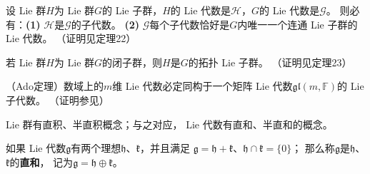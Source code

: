 
\begin{theorem}\label{chlg:thm_suglieg}  %
    设 Lie 群$H$为 Lie 群$G$的 Lie 子群，$H$的 Lie 代数是$\mathscr{H}$，$G$的 Lie 代数是$\mathscr{G}$。
    则必有：{\bfseries (1)} $\mathscr{H}$是$\mathscr{G}$的子代数。
    {\bfseries (2)} $\mathscr{G}$每个子代数恰好是$G$内唯一一个连通 Lie 子群的 Lie 代数。
    （证明见\parencite[\S 3.8]{huangxg-2024}定理22）
\end{theorem}

\begin{theorem}\label{chlg:thm_subg-cartan}  %
    若 Lie 群$H$为 Lie 群$G$的闭子群，则$H$是$G$的拓扑 Lie 子群。 （证明见\parencite[\S 3.8]{huangxg-2024}定理23） 
\end{theorem}





\begin{theorem}\label{chlg:thm_Ado}
    （Ado定理）数域上的$m$维 Lie 代数必定同构于一个矩阵 Lie 代数$\mathfrak{gl}(m,\mathbb{F})$的 Lie 子代数。
    （证明参见\parencite[\S 7.4]{Hilgert-2012}）
\end{theorem}



  

 Lie 群有直积、半直积概念；与之对应， Lie 代数有直和、半直和的概念。

\begin{definition}
    如果 Lie 代数$\mathfrak{g}$有两个理想$\mathfrak{h}$、$\mathfrak{k}$，并且满足
    $\mathfrak{g}=\mathfrak{h}+\mathfrak{k}$、$\mathfrak{h}\cap\mathfrak{k}=\{0\}$；
    那么称$\mathfrak{g}$是$\mathfrak{h}$、$\mathfrak{k}$的\textbf{直和}，
    记为$\mathfrak{g}=\mathfrak{h}\oplus\mathfrak{k}$。
\end{definition}

